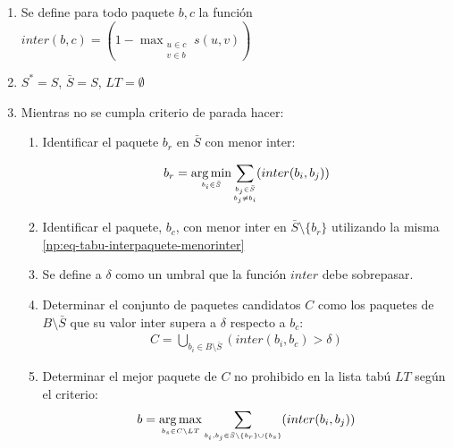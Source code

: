 \begin{enumerate}

\item Se define para todo paquete $b,c$ la función $inter(b,c) = (1-\max_{\substack{\scriptscriptstyle  u\in c \\ \scriptscriptstyle v \in b}} s(u,v))$

\item $S^* = S$, $ \bar{S}= S$, $LT = \emptyset$

\item Mientras no se cumpla criterio de parada hacer:

\begin{enumerate}
\item Identificar el paquete $b_r$ en $\bar{S}$ con menor inter:

\begin{equation} \label{np:eq-tabu-interpaquete-menorinter}
b_r = \operatorname*{arg\,min}_{\scriptscriptstyle b_i \in \bar{S}} \sum_{\substack{\scriptscriptstyle  b_j \in \bar{S} \\ \scriptscriptstyle  b_j \ne b_i}} (inter(b_i, b_j))
\end{equation}

\item Identificar el paquete, $b_c$, con menor inter en $\bar{S} \setminus \{b_r\}$ utilizando la misma \autoref{np:eq-tabu-interpaquete-menorinter}

\item Se define a $\delta$ como un umbral que la función $inter$ debe sobrepasar.

\item Determinar el conjunto de paquetes candidatos $C$ como los paquetes de $B\setminus \bar{S}$ que su valor inter supera a $\delta$ respecto a $b_c$:
\begin{align*}
C = \bigcup_{\scriptscriptstyle b_i \in B \setminus \bar{S}} (inter(b_i,b_c) > \delta)
\end{align*}

\item Determinar el mejor paquete de $C$ no prohibido en la lista tabú $LT$ según el criterio:
\begin{align*}
b = \operatorname*{arg\,max}_{\scriptscriptstyle b_s \in C \setminus LT} \sum_{\scriptscriptstyle b_i, b_j \in \bar{S}\setminus \{b_r\} \cup \{b_s\}}(inter(b_i,b_j))
\end{align*}


\end{enumerate}
\end{enumerate}
